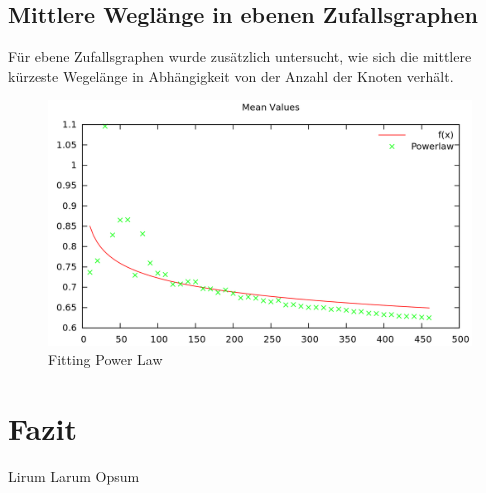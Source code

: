\documentclass[10pt]{article}
\begin{document}
\subsection{Mittlere Weglänge in ebenen Zufallsgraphen}
Für ebene Zufallsgraphen wurde zusätzlich untersucht, wie sich die mittlere kürzeste Wegelänge in Abhängigkeit von der Anzahl der Knoten verhält. 

\begin{figure}[h!]
  \centering
  \includegraphics[width=\linewidth]{../Results/Power_PlanarMean.png}
  \caption{Fitting Power Law}
\label{fig:planarMean}
\end{figure}

\section{Fazit}
Lirum Larum Opsum
\end{document}
